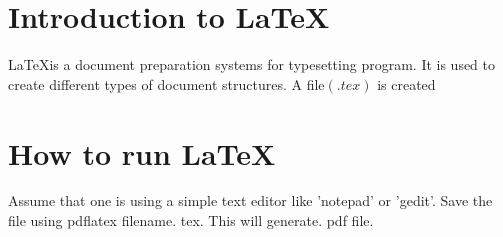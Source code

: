\documentclass{article}
\begin{document}
\section{Introduction to \LaTeX}
\LaTeX is a document preparation systems for typesetting program. It is used to create
different types of document structures. A file$(.tex)$ is created
\section{How to run \LaTeX}
Assume that one is using a simple text editor like 'notepad' or 'gedit'. Save the file using pdflatex filename. tex. This will generate. pdf file.
\end{document}
